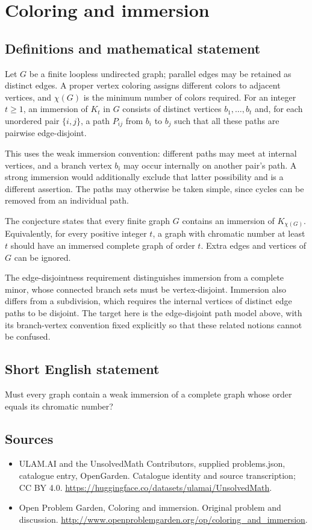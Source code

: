 \documentclass[11pt,a4paper]{article}
\begin{document}
\section*{Coloring and immersion}\label{statement}

\subsection{Definitions and mathematical statement}
Let $G$ be a finite loopless undirected graph; parallel edges may be retained as distinct edges. A proper vertex coloring assigns different colors to adjacent vertices, and $\chi(G)$ is the minimum number of colors required. For an integer $t\ge1$, an immersion of $K_t$ in $G$ consists of distinct vertices $b_1,\ldots,b_t$ and, for each unordered pair $\{i,j\}$, a path $P_{ij}$ from $b_i$ to $b_j$ such that all these paths are pairwise edge-disjoint.

This uses the weak immersion convention: different paths may meet at internal vertices, and a branch vertex $b_i$ may occur internally on another pair's path. A strong immersion would additionally exclude that latter possibility and is a different assertion. The paths may otherwise be taken simple, since cycles can be removed from an individual path.

The conjecture states that every finite graph $G$ contains an immersion of $K_{\chi(G)}$. Equivalently, for every positive integer $t$, a graph with chromatic number at least $t$ should have an immersed complete graph of order $t$. Extra edges and vertices of $G$ can be ignored.

The edge-disjointness requirement distinguishes immersion from a complete minor, whose connected branch sets must be vertex-disjoint. Immersion also differs from a subdivision, which requires the internal vertices of distinct edge paths to be disjoint. The target here is the edge-disjoint path model above, with its branch-vertex convention fixed explicitly so that these related notions cannot be confused.
\subsection{Short English statement}
Must every graph contain a weak immersion of a complete graph whose order equals its chromatic number?
\subsection{Sources}
\begin{itemize}
\item[S1] ULAM.AI and the UnsolvedMath Contributors, supplied problems.json, catalogue entry, OpenGarden. Catalogue identity and source transcription; CC BY 4.0.
\url{https://huggingface.co/datasets/ulamai/UnsolvedMath}.
\item[S2] Open Problem Garden, Coloring and immersion. Original problem and discussion.
\url{http://www.openproblemgarden.org/op/coloring_and_immersion}.
\end{itemize}
\end{document}
